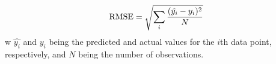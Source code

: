 $$\textnormal{RMSE}=\sqrt{\sum\limits_{i}\frac{(\hat{y_i}-y_i)^2}{N}}$$
w $\hat{y_i}$ and $y_i$ being the predicted and actual values for the $i$th data point, respectively, and $N$ being the number of observations.